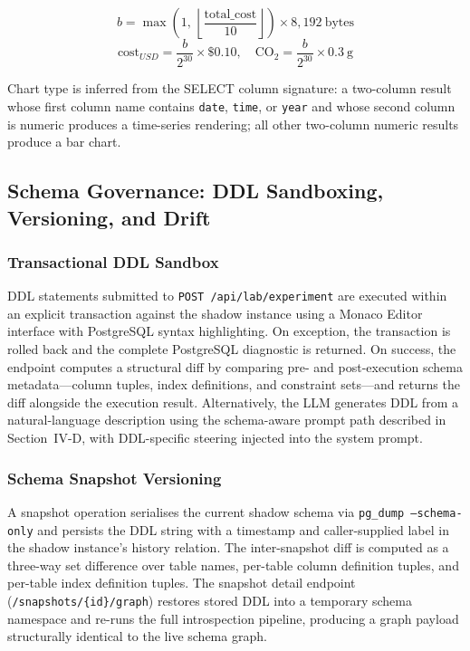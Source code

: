 \documentclass[conference]{IEEEtran}
\begin{document}
\begin{equation}
    b = \max\!\left(1,\, \left\lfloor\frac{\text{total\_cost}}{10}\right\rfloor\right) \times 8{,}192\ \text{bytes}
\end{equation}
\begin{equation}
    \text{cost}_{USD} = \frac{b}{2^{30}} \times \$0.10, \quad
    \text{CO}_2 = \frac{b}{2^{30}} \times 0.3\ \text{g}
\end{equation}

Chart type is inferred from the SELECT column signature: a two-column
result whose first column name contains \texttt{date}, \texttt{time}, or
\texttt{year} and whose second column is numeric produces a time-series
rendering; all other two-column numeric results produce a bar chart.

\subsection{Schema Governance: DDL Sandboxing, Versioning, and Drift}

\subsubsection{Transactional DDL Sandbox}

DDL statements submitted to \texttt{POST /api/lab/experiment} are executed
within an explicit transaction against the shadow instance using a Monaco
Editor interface with PostgreSQL syntax highlighting. On exception, the
transaction is rolled back and the complete PostgreSQL diagnostic is
returned. On success, the endpoint computes a structural diff by comparing
pre- and post-execution schema metadata---column tuples, index definitions,
and constraint sets---and returns the diff alongside the execution result.
Alternatively, the LLM generates DDL from a natural-language description
using the schema-aware prompt path described in Section~IV-D, with
DDL-specific steering injected into the system prompt.

\subsubsection{Schema Snapshot Versioning}

A snapshot operation serialises the current shadow schema via
\texttt{pg\_dump --schema-only} and persists the DDL string with a
timestamp and caller-supplied label in the shadow instance's history
relation. The inter-snapshot diff is computed as a three-way set difference
over table names, per-table column definition tuples, and per-table index
definition tuples. The snapshot detail endpoint
(\texttt{/snapshots/\{id\}/graph}) restores stored DDL into a temporary
schema namespace and re-runs the full introspection pipeline, producing a
graph payload structurally identical to the live schema graph.
\end{document}
